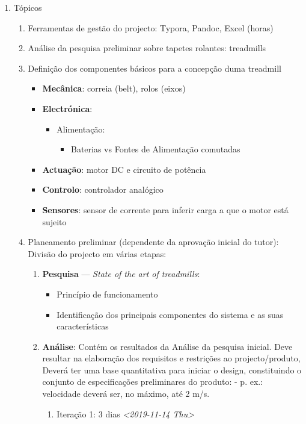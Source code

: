\documentclass[11pt]{article}
\begin{document}
\begin{enumerate}
\item Tópicos
\label{sec:org108efd5}
\begin{enumerate}
\item Ferramentas de gestão do projecto: Typora, Pandoc, Excel (horas)
\item Análise da pesquisa preliminar sobre tapetes rolantes: treadmills
\item Definição dos componentes básicos para a concepção duma treadmill
\begin{itemize}
\item \textbf{Mecânica}: correia (belt), rolos (eixos)
\item \textbf{Electrónica}:
\begin{itemize}
\item Alimentação:
\begin{itemize}
\item Baterias vs Fontes de Alimentação comutadas
\end{itemize}
\end{itemize}
\item \textbf{Actuação}: motor DC e circuito de potência
\item \textbf{Controlo}: controlador analógico
\item \textbf{Sensores}: sensor de corrente para inferir carga a que o motor está
sujeito
\end{itemize}
\item Planeamento preliminar (dependente da aprovação inicial do tutor): Divisão do
projecto em várias etapas:
\begin{enumerate}
\item \textbf{Pesquisa} --- \emph{State of the art of treadmills}:
\begin{itemize}
\item Princípio de funcionamento
\item Identificação dos principais componentes do sistema e as suas
características
\end{itemize}
\item \textbf{Análise}: Contém os resultados da Análise da pesquisa inicial. Deve
resultar na elaboração dos requisitos e restrições ao projecto/produto,
Deverá ter uma base quantitativa para iniciar o design, constituindo o
conjunto de especificações preliminares do produto: - p. ex.: velocidade
deverá ser, no máximo, até 2 m/s.
\begin{enumerate}
\item Iteração 1: 3 dias \textit{<2019-11-14 Thu>}

\end{enumerate}
\end{enumerate}
\end{enumerate}
\end{enumerate}
\end{document}
